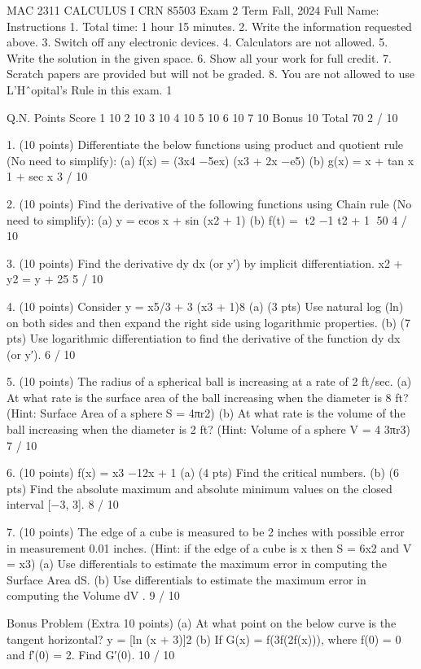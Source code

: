 MAC 2311 CALCULUS I CRN 85503
Exam 2
Term Fall, 2024
Full Name:
Instructions
1. Total time: 1 hour 15 minutes.
2. Write the information requested above.
3. Switch off any electronic devices.
4. Calculators are not allowed.
5. Write the solution in the given space.
6. Show all your work for full credit.
7. Scratch papers are provided but will not be graded.
8. You are not allowed to use L’Hˆopital’s Rule in this exam.
1

Q.N.
Points
Score
1
10
2
10
3
10
4
10
5
10
6
10
7
10
Bonus
10
Total
70
2 / 10

1. (10 points) Differentiate the below functions using product and quotient rule (No need to simplify):
(a) f(x) = (3x4 −5ex) (x3 + 2x −e5)
(b) g(x) = x + tan x
1 + sec x
3 / 10

2. (10 points) Find the derivative of the following functions using Chain rule (No need to simplify):
(a) y = ecos x + sin (x2 + 1)
(b) f(t) =
t2 −1
t2 + 1
50
4 / 10

3. (10 points) Find the derivative dy
dx (or y′) by implicit differentiation.
x2 + y2 = y + 25
5 / 10

4. (10 points) Consider y = x5/3  + 3
(x3 + 1)8
(a) (3 pts) Use natural log (ln) on both sides and then expand the right side using logarithmic properties.
(b) (7 pts) Use logarithmic differentiation to find the derivative of the function dy
dx (or y′).
6 / 10

5. (10 points) The radius of a spherical ball is increasing at a rate of 2 ft/sec.
(a) At what rate is the surface area of the ball increasing when the diameter is 8 ft?
(Hint: Surface Area of a sphere S = 4πr2)
(b) At what rate is the volume of the ball increasing when the diameter is 2 ft?
(Hint: Volume of a sphere V = 4
3πr3)
7 / 10

6. (10 points) f(x) = x3 −12x + 1
(a) (4 pts) Find the critical numbers.
(b) (6 pts) Find the absolute maximum and absolute minimum values on the closed interval [−3, 3].
8 / 10

7. (10 points) The edge of a cube is measured to be 2 inches with possible error in measurement 0.01 inches.
(Hint: if the edge of a cube is x then S = 6x2 and V = x3)
(a) Use differentials to estimate the maximum error in computing the Surface Area dS.
(b) Use differentials to estimate the maximum error in computing the Volume dV .
9 / 10

Bonus Problem (Extra 10 points)
(a) At what point on the below curve is the tangent horizontal?
y = [ln (x + 3)]2
(b) If G(x) = f(3f(2f(x))),
where f(0) = 0 and f′(0) = 2.
Find G′(0).
10 / 10

